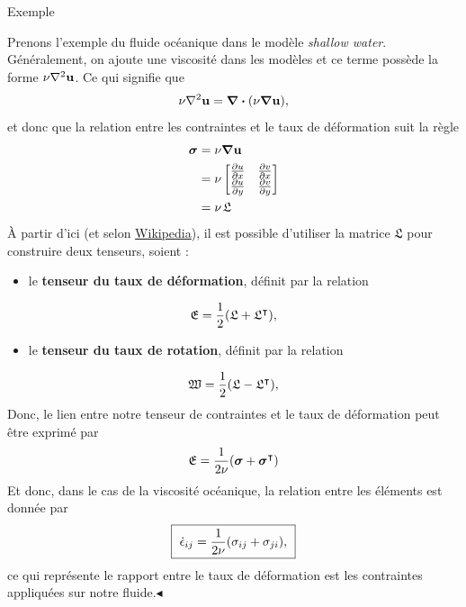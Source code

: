 \documentclass[10pt]{article}
\numberwithin{equation}{section}
\newcommand{\uu}{\vb{u}}
\newcommand{\pt}{\hspace{1pt}} %
\newcommand{\exemple}{
\parbox[center]{2.2cm}{\begin{tcolorbox}[sharp corners, rounded corners=northeast, rounded corners=southeast,
colback=Violet!2, colframe=black,
size=small, width=2cm, left=-0.25pt, bottom=-0.5pt,
arc is angular, arc=2.5mm, boxrule=0.35pt, leftrule=4pt, %
after={\enskip}] Exemple \end{tcolorbox}}}
\newcommand{\cqfd}{\hfill$\blacktriangleleft$}
\begin{document}
\exemple Prenons l'exemple du fluide océanique dans le modèle \emph{shallow water}.
Généralement, on ajoute une viscosité dans les modèles et ce terme possède la forme \(\nu\laplacian{\uu}\).
Ce qui signifie que
\begin{align}
   \nu\laplacian{\uu} = \divergence{\qty(\nu\gradient{\uu})},
\end{align}
et donc que la relation entre les contraintes et le taux de déformation suit la règle
\begin{align}
   \boldsymbol{\sigma}
   &= \nu\gradient{\uu} \nonumber\\
   &= \nu \begin{bmatrix}
     \pdv{u}{x} & \pdv{v}{x} \\
     \pdv{u}{y} & \pdv{v}{y} \\
   \end{bmatrix}\nonumber\\
   &= \nu\pt \mathfrak{L}
\end{align}
À partir d'ici (et selon \href{https://en.wikipedia.org/wiki/Strain-rate\_tensor}{Wikipedia}), il est possible d'utiliser la matrice \(\mathfrak{L}\) pour construire deux tenseurs, soient :
\begin{itemize}
\item le \textbf{tenseur du taux de déformation}, définit par la relation
\end{itemize}
\begin{equation}
   \mathfrak{E} = \frac{1}{2}\qty(\mathfrak{L} + \mathfrak{L}^\intercal),
\end{equation}
\begin{itemize}
\item le \textbf{tenseur du taux de rotation}, définit par la relation
\end{itemize}
\begin{equation}
   \mathfrak{W} = \frac{1}{2}\qty(\mathfrak{L} - \mathfrak{L}^\intercal),
\end{equation}
Donc, le lien entre notre tenseur de contraintes et le taux de déformation peut être exprimé par
\begin{equation}
   \mathfrak{E} = \frac{1}{2\nu}\qty(\boldsymbol{\sigma} + \boldsymbol{\sigma}^\intercal)
\end{equation}
Et donc, dans le cas de la viscosité océanique, la relation entre les éléments est donnée par
\begin{equation}
   \boxed{\ \dot{\epsilon}_{ij} = \frac{1}{2\nu}\qty(\sigma_{ij}+\sigma_{ji}),\ } 
\end{equation}
ce qui représente le rapport entre le taux de déformation est les contraintes appliquées sur notre fluide.\cqfd\bigskip
\end{document}
